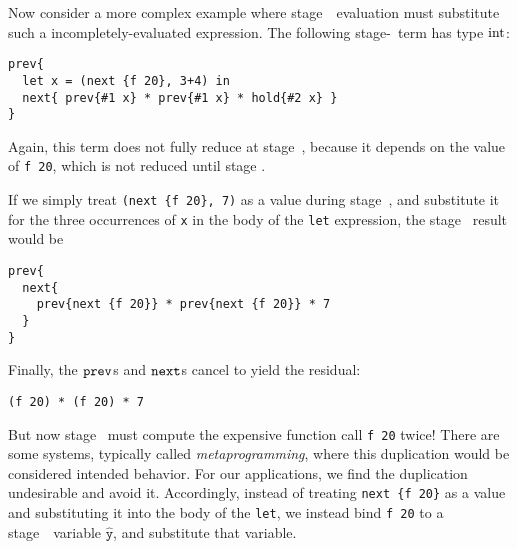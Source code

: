 Now consider a more complex example where stage~\bbone\ evaluation must
substitute such a incompletely-evaluated expression. The following
stage-\bbtwo\ term has type ${\rm int}$:
\begin{lstlisting} 
prev{
  let x = (next {f 20}, 3+4) in
  next{ prev{#1 x} * prev{#1 x} * hold{#2 x} }
}
\end{lstlisting}
Again, this term does not fully reduce at stage~\bbone, because it depends on
the value of \verb|f 20|, which is not reduced until stage \bbtwo.

If we simply treat \verb|(next {f 20}, 7)| as a value during stage~\bbone, and
substitute it for the three occurrences of \verb|x| in the body of the
\verb|let| expression, the stage \bbone\ result would be
\begin{lstlisting} 
prev{
  next{ 
    prev{next {f 20}} * prev{next {f 20}} * 7 
  }
}
\end{lstlisting}
Finally, the ${\tt prev}$s and ${\tt next}$s cancel to yield the residual:
\begin{lstlisting} 
(f 20) * (f 20) * 7
\end{lstlisting}
But now stage \bbtwo\ must compute the expensive function call \verb|f 20| twice! 
There are some systems, typically called {\em metaprogramming}, 
where this duplication would be considered intended behavior.
For our applications, we find the duplication undesirable and avoid it.
Accordingly, instead of treating \verb|next {f 20}| as a
value and substituting it into the body of the \verb|let|, we instead bind
\verb|f 20| to a stage~\bbtwo\ variable $\mathtt{\hat y}$, and substitute that
variable.

